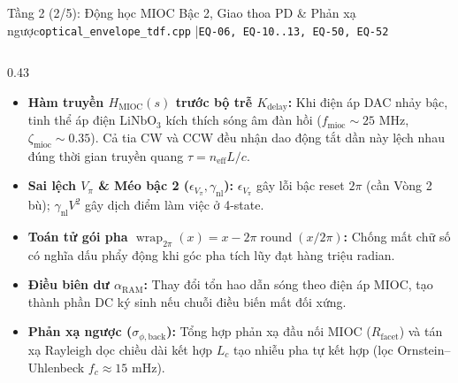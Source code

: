 \documentclass[aspectratio=169,8pt]{beamer}
\begin{document}
\begin{frame}{Tầng 2 (2/5): Động học MIOC Bậc 2, Giao thoa PD \& Phản xạ ngược}{\texttt{optical\_envelope\_tdf.cpp} \enspace|\enspace \texttt{EQ-06, EQ-10..13, EQ-50, EQ-52}}
\begin{columns}[T]
\begin{column}{0.43\textwidth}
    \begin{remarkbox}
      \begin{itemize}\setlength\itemsep{2.5pt}
        \item \textbf{Hàm truyền $H_{\text{MIOC}}(s)$ trước bộ trễ $K_{\text{delay}}$:} Khi điện áp DAC nhảy bậc, tinh thể áp điện $\text{LiNbO}_3$ kích thích sóng âm đàn hồi ($f_{\text{mioc}}\sim 25\text{ MHz}$, $\zeta_{\text{mioc}}\sim 0.35$). Cả tia CW và CCW đều nhận dao động tắt dần này lệch nhau đúng thời gian truyền quang $\tau = n_{\text{eff}}L/c$.
        \item \textbf{Sai lệch $V_\pi$ \& Méo bậc 2 ($\epsilon_{V_\pi}, \gamma_{\text{nl}}$):} $\epsilon_{V_\pi}$ gây lỗi bậc reset $2\pi$ (cần Vòng 2 bù); $\gamma_{\text{nl}}V^2$ gây dịch điểm làm việc ở 4-state.
        \item \textbf{Toán tử gói pha $\operatorname{wrap}_{2\pi}(x) = x - 2\pi\operatorname{round}(x/2\pi)$:} Chống mất chữ số có nghĩa dấu phẩy động khi góc pha tích lũy đạt hàng triệu radian.
        \item \textbf{Điều biên dư $\alpha_{\text{RAM}}$:} Thay đổi tổn hao dẫn sóng theo điện áp MIOC, tạo thành phần DC ký sinh nếu chuỗi điều biến mất đối xứng.
        \item \textbf{Phản xạ ngược ($\sigma_{\phi,\text{back}}$):} Tổng hợp phản xạ đầu nối MIOC ($R_{\text{facet}}$) và tán xạ Rayleigh dọc chiều dài kết hợp $L_c$ tạo nhiễu pha tự kết hợp (lọc Ornstein--Uhlenbeck $f_c\approx 15\text{ mHz}$).
      \end{itemize}
    \end{remarkbox}
  \end{column}
\end{columns}
\end{frame}
\end{document}
